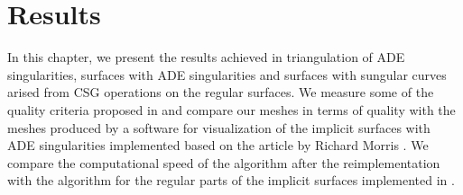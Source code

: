 \newcommand*{\MinNumberC}{0.5}%
\newcommand*{\MidNumberC}{0.75}%
\newcommand*{\MaxNumberC}{1.0}%
  
\newcommand{\ApplyGradientC}[1]{%
  \iftoggle{inTableHeader}{#1}{
    \ifdim #1 pt > \MidNumberC pt
        \pgfmathsetmacro{\PercentColor}{max(min(100.0*(#1 - \MidNumberC)/(\MaxNumberC-\MidNumberC),100.0),0.00)} %
        \colorbox{red!\PercentColor!yellow}{#1}
    \else
        \pgfmathsetmacro{\PercentColor}{max(min(100.0*(\MidNumberC - #1)/(\MidNumberC-\MinNumberC),100.0),0.00)} %
        \colorbox{green!\PercentColor!yellow}{#1}
    \fi
  }
  }

  
\newcommand*{\MinNumberD}{0.5}%
\newcommand*{\MidNumberD}{0.75}%
\newcommand*{\MaxNumberD}{1.0}%

\newcommand{\ApplyGradientD}[1]{%
  \iftoggle{inTableHeader}{#1}{
    \ifdim #1 pt > \MidNumberD pt
        \pgfmathsetmacro{\PercentColor}{max(min(100.0*(#1 - \MidNumberD)/(\MaxNumberD-\MidNumberD),100.0),0.00)} %
        \colorbox{red!\PercentColor!yellow}{#1}
    \else
        \pgfmathsetmacro{\PercentColor}{max(min(100.0*(\MidNumberD - #1)/(\MidNumberD-\MinNumberD),100.0),0.00)} %
        \colorbox{green!\PercentColor!yellow}{#1}
    \fi
  }
  }
  

\renewcommand{\arraystretch}{1}
\setlength{\fboxsep}{2mm} %
\setlength{\tabcolsep}{-4pt}








\chapter{Results}
\label{chap4}

In this chapter, we present the results achieved in triangulation of
ADE singularities, surfaces with ADE singularities and surfaces with 
sungular curves arised from CSG operations on the regular surfaces.
We measure some of the quality criteria proposed in \cite{korecova2021triangulation}
and compare our meshes in terms of quality with the meshes produced by a software 
for visualization of the implicit surfaces with ADE singularities implemented
based on the article by Richard Morris \cite{morris2003client}.
We compare the computational speed of the algorithm after the reimplementation
with the algorithm for the regular parts of the implicit surfaces 
implemented in \cite{korecova2021triangulation}.

